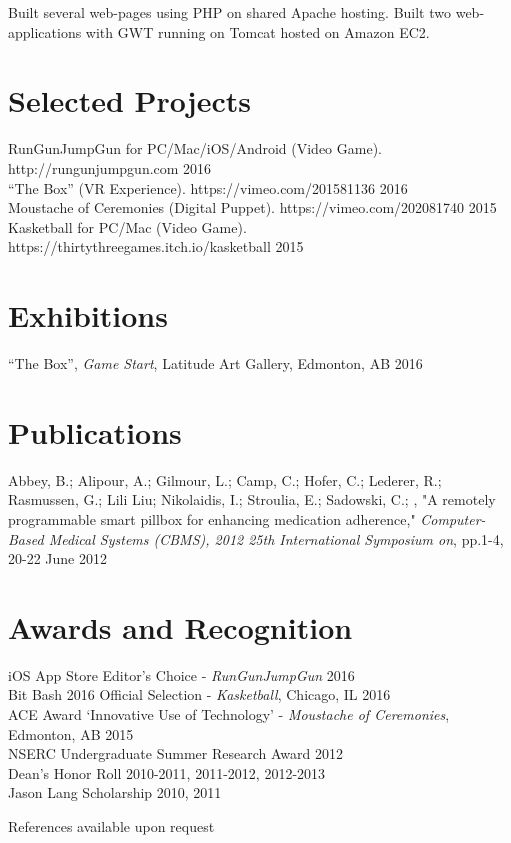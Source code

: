 \documentclass[10pt]{article}
\begin{document}
Built several web-pages using PHP on shared Apache hosting. Built two web-applications with GWT running on Tomcat hosted on Amazon EC2.

\section*{Selected Projects}

RunGunJumpGun for PC/Mac/iOS/Android (Video Game). http://rungunjumpgun.com \hfill 2016 \\

``The Box'' (VR Experience). https://vimeo.com/201581136 \hfill 2016 \\

Moustache of Ceremonies (Digital Puppet). https://vimeo.com/202081740 \hfill 2015 \\

Kasketball for PC/Mac (Video Game). https://thirtythreegames.itch.io/kasketball \hfill 2015 \\

\section*{Exhibitions}
``The Box'', \emph{Game Start}, Latitude Art Gallery, Edmonton, AB \hfill 2016 \\
\section*{Publications}
Abbey, B.; Alipour, A.; Gilmour, L.; Camp, C.; Hofer, C.; Lederer, R.; Rasmussen, G.; Lili Liu; Nikolaidis, I.; Stroulia, E.; Sadowski, C.; , "A remotely programmable smart pillbox for enhancing medication adherence," \emph{Computer-Based Medical Systems (CBMS), 2012 25th International Symposium on}, pp.1-4, 20-22 June 2012

\section*{Awards and Recognition}

\noindent iOS App Store Editor's Choice - \emph{RunGunJumpGun} \hfill 2016 \\

\noindent Bit Bash 2016 Official Selection - \emph{Kasketball}, Chicago, IL \hfill 2016 \\

\noindent ACE Award ‘Innovative Use of Technology’ - \emph{Moustache of Ceremonies}, Edmonton, AB \hfill 2015 \\

\noindent NSERC Undergraduate Summer Research Award \hfill 2012 \\

\noindent Dean's Honor Roll \hfill 2010-2011, 2011-2012, 2012-2013 \\

\noindent Jason Lang Scholarship \hfill 2010, 2011 \\

\vspace{\baselineskip}

\noindent References available upon request
\end{document}
